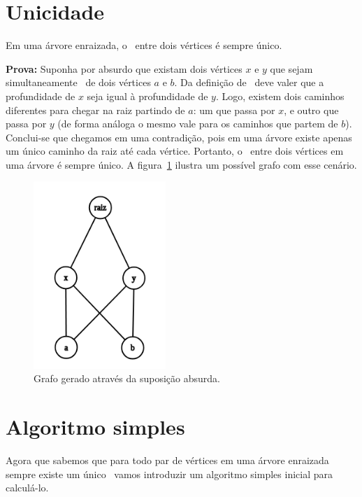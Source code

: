 \section{Unicidade}

\begin{definition}
\label{unicidade}
Em uma árvore enraizada, o \LCA\ entre dois vértices é sempre único.
\end{definition}

\noindent
\textbf{Prova: }
Suponha por absurdo que existam dois vértices $x$ e $y$ que sejam simultaneamente \LCA\ de dois vértices $a$ e $b$. Da definição de \LCA\ deve valer que a profundidade de $x$ seja igual à profundidade de $y$. Logo, existem dois caminhos diferentes para chegar na raiz partindo de $a$: um que passa por $x$, e outro que passa por $y$ (de forma análoga o mesmo vale para os caminhos que partem de $b$). Conclui-se que chegamos em uma contradição, pois em uma árvore existe apenas um único caminho da raiz até cada vértice. Portanto, o \LCA\ entre dois vértices em uma árvore é sempre único. A figura~\ref{fig:grafo-nao-arvore} ilustra um possível grafo com esse cenário.

\begin{figure}[htb]
\begin{center}
\includegraphics[width=5cm]{images/graph2}
\end{center}
\caption{\label{fig:grafo-nao-arvore}Grafo gerado através da suposição absurda.}
\end{figure}



\section{Algoritmo simples}

Agora que sabemos que para todo par de vértices em uma árvore enraizada sempre existe um único \LCA\, vamos introduzir um algoritmo simples inicial para calculá-lo.

